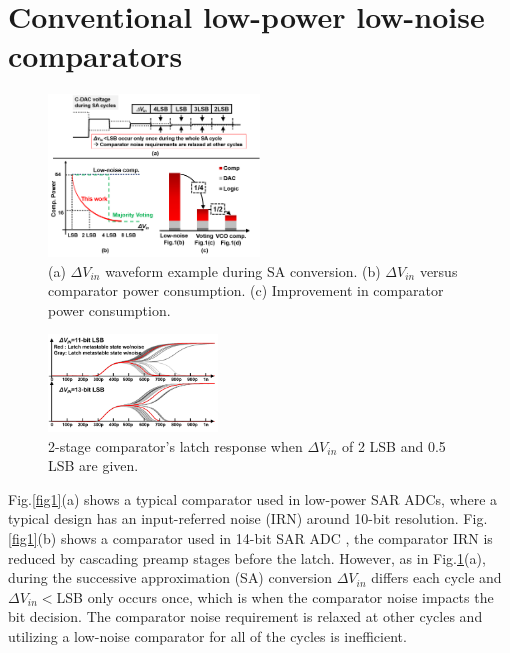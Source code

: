 \documentclass[journal]{IEEEtran}
\begin{document}
\section{Conventional low-power low-noise comparators}


\begin{figure}[!]
\centering
 \includegraphics[width=0.5\textwidth]{figs/fig2.png}
  \caption{(a) $\Delta V_{in}$ waveform example during SA conversion.
  (b) $\Delta V_{in}$ versus comparator power consumption.
(c) Improvement in comparator power consumption.
}
  \label{fig2}
\end{figure}
\begin{figure}[!]
\centering
 \includegraphics[width=0.4\textwidth]{figs/conventional-strongarm.png}
  \caption{2-stage comparator's latch response when $\Delta V_{in}$ of 2 LSB and 0.5 LSB are given.}
  \label{meta}
\end{figure}

Fig.\ref{fig1}(a) shows a typical comparator used in low-power SAR ADCs\cite{miyahara2008low}, where a typical design has an input-referred noise (IRN) around 10-bit resolution. Fig.\ref{fig1}(b) shows a comparator used in 14-bit SAR ADC \cite{hesener200714b}, the comparator IRN is reduced by cascading preamp stages before the latch. However, as in Fig.\ref{fig2}(a), during the successive approximation (SA) conversion $\Delta V_{in}$ differs each cycle and $\Delta V_{in}<$LSB only occurs once, which is when the comparator noise impacts the bit decision. The comparator noise requirement is relaxed at other cycles and utilizing a low-noise comparator for all of the cycles is inefficient. 
\end{document}
